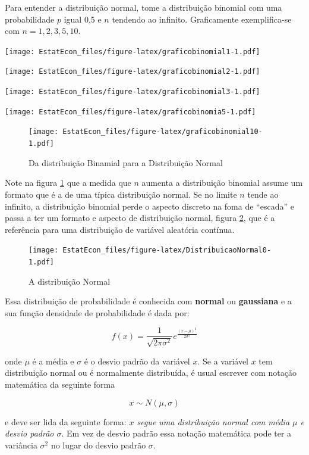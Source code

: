 \documentclass[
]{book}
\begin{document}
Para entender a distribuição normal, tome a distribuição binomial com uma probabilidade \(p\) igual 0,5 e \(n\) tendendo ao infinito. Graficamente exemplifica-se com \(n=1,2,3,5,10\).

\texttt{[image: EstatEcon\_files/figure-latex/graficobinomial1-1.pdf]}

\texttt{[image: EstatEcon\_files/figure-latex/graficobinomial2-1.pdf]}

\texttt{[image: EstatEcon\_files/figure-latex/graficobinomial3-1.pdf]}

\texttt{[image: EstatEcon\_files/figure-latex/graficobinomia5-1.pdf]}

\begin{figure}
\centering
\texttt{[image: EstatEcon\_files/figure-latex/graficobinomial10-1.pdf]}
\caption{\label{fig:graficobinomial10}Da distribuição Binamial para a Distribuição Normal}
\end{figure}

Note na figura \ref{fig:graficobinomial10} que a medida que \(n\) aumenta a distribuição binomial assume um formato que é a de uma típica distribuição normal. Se no limite \(n\) tende ao infinito, a distribuição binomial perde o aspecto discreto na foma de ``escada'' e passa a ter um formato e aspecto de distribuição normal, figura \ref{fig:DistribuicaoNormal0}, que é a referência para uma distribuição de variável aleatória contínua.

\begin{figure}
\centering
\texttt{[image: EstatEcon\_files/figure-latex/DistribuicaoNormal0-1.pdf]}
\caption{\label{fig:DistribuicaoNormal0}A distribuição Normal}
\end{figure}

Essa distribuição de probabilidade é conhecida com \textbf{normal} ou \textbf{gaussiana} e a sua função densidade de probabilidade é dada por:

\[
  f(x) = \dfrac{1}{\sqrt{2\pi\sigma^2}}e^{\frac{(x-\mu)^2}{2\sigma^2}}
  \label{eq:fdpNormal}
\]

onde \(\mu\) é a média e \(\sigma\) é o desvio padrão da variável \(x\). Se a variável \(x\) tem distribuição normal ou é normalmente distribuída, é usual escrever com notação matemática da seguinte forma

\[
  x \sim N(\mu,\sigma)
\]

e deve ser lida da seguinte forma: \emph{\(x\) segue uma distribuição normal com média \(\mu\) e desvio padrão \(\sigma\)}. Em vez de desvio padrão essa notação matemática pode ter a variância \(\sigma^2\) no lugar do desvio padrão \(\sigma\).
\end{document}
